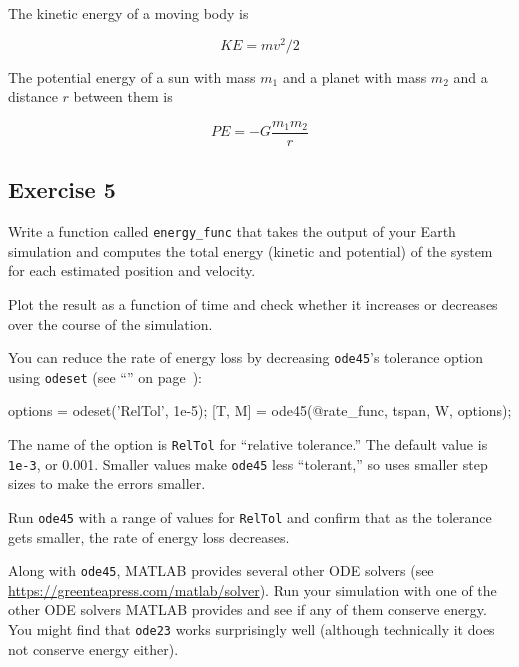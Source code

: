 
The kinetic energy of a moving body is

\begin{equation*}
KE = m v^2 / 2
\end{equation*}

The potential energy of a sun with mass $m_1$ and a
planet with mass $m_2$ and a distance $r$ between them is

\begin{equation*}
PE = -G \frac{m_1 m_2}{r}
\end{equation*}

\subsection{Exercise 5}

Write a function called \lstinline{energy_func} that takes the output of
your Earth simulation and computes the total
energy (kinetic and potential) of the system for each estimated
position and velocity.

Plot the result as a function of time and
check whether it increases or decreases over the course of the simulation.


You can reduce the rate of energy loss by decreasing \lstinline{ode45}'s
tolerance option using \lstinline{odeset} (see ``'' on page~\pageref{events}):

\begin{code}
options = odeset('RelTol', 1e-5);
[T, M] = ode45(@rate_func, tspan, W, options);
\end{code}

The name of the option is \lstinline{RelTol} for ``relative tolerance.''
The default value is \lstinline{1e-3}, or 0.001.  Smaller values
make \lstinline{ode45} less ``tolerant,'' so uses smaller step sizes to
make the errors smaller.


Run \lstinline{ode45} with a range of values for \lstinline{RelTol} and confirm
that as the tolerance gets smaller, the rate of energy loss
decreases.


Along with \lstinline{ode45}, MATLAB provides several other ODE solvers
(see \url{https://greenteapress.com/matlab/solver}).
Run your simulation with one of the other ODE solvers MATLAB provides
and see if any of them conserve energy.  You might find that \lstinline{ode23} works surprisingly well (although technically it does not conserve energy either).


